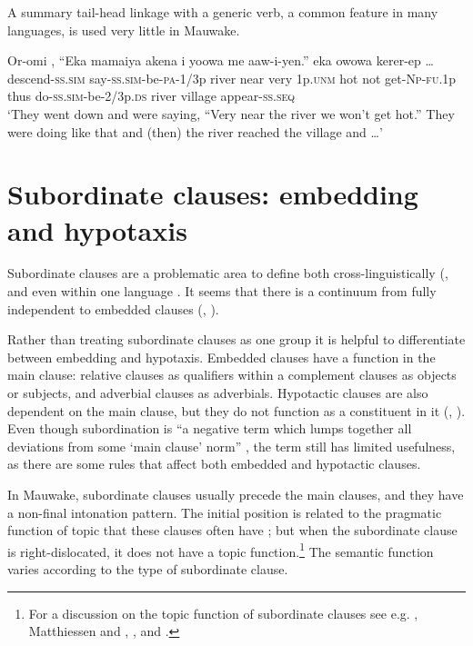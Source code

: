 A summary tail-head linkage with a generic verb, a common feature in many  languages, is used very little in Mauwake. 

\ea%
\label{ex:x1520}
\gll Or-omi  ,  ``Eka  mamaiya  akena i  yoowa  me  aaw-i-yen.''    eka owowa kerer-ep {\dots}\\
descend-\textsc{ss}.\textsc{sim} say-\textsc{ss}.\textsc{sim}-be-\textsc{pa}-1/3p river near very 1p.\textsc{unm} hot  not  get-\textsc{Np}-\textsc{fu}.1p thus do-\textsc{ss}.\textsc{sim}-be-2/3p.\textsc{ds} river  village  appear-\textsc{ss}.\textsc{seq}\\
\glt`They went down and were saying, ``Very near the river we won't get hot.'' They were doing like that and (then) the river reached the village and {\dots}'
\z


\section{Subordinate clauses: embedding and hypotaxis}

Subordinate clauses are a problematic area to define both cross-linguistically (\citealt{HaimanEtAl1984}, \citealt[317]{MatthiessenEtAl1988} and even within one language \citep[848]{Givon1990}. It seems that there is a continuum from fully independent to embedded clauses (\citealt[207]{Reesink1987}, \citealt[189]{Lehmann1988}). 

Rather than treating subordinate clauses as one group it is helpful to differentiate between embedding and hypotaxis. Embedded clauses have a function in the main clause: relative clauses as qualifiers within a  complement clauses as objects or subjects, and adverbial clauses as adverbials. Hypotactic clauses are also dependent on the main clause, but they do not function as a constituent in it (\citealt[219]{Halliday1985}, \citealt{Lehmann1988}). Even though subordination is ``a negative term which lumps together all deviations from some `main clause' norm'' \citep[510]{HaimanEtAl1984}%
, the term still has limited usefulness, as there are some rules that affect both embedded and hypotactic clauses.  

In Mauwake, subordinate clauses usually precede the main clauses, and they have a non-final intonation pattern. The initial position is related to the pragmatic function of topic that these clauses often have \citep[187]{Lehmann1988}; but when the subordinate clause is right-dislocated, it does not have a topic function.\footnote{For a discussion on the topic function of subordinate clauses see e.g. \citet{Reesink1983b, Reesink1987}, Matthiessen and \citet{Thompson1988}, \citet{LehmannEtAl1988}, and \citet{LongacreEtAl2007}.}  The semantic function varies according to the type of subordinate clause. 

